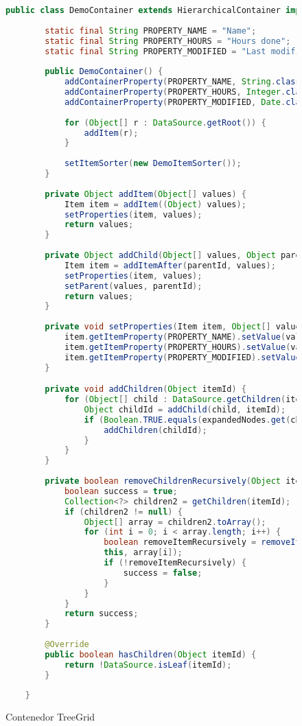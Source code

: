 \begin{figure}[!tb]
	\centering
	\begin{lstlisting}[language=Java]
	public class DemoContainer extends HierarchicalContainer implements Collapsible, Measurable {
	
		static final String PROPERTY_NAME = "Name";
		static final String PROPERTY_HOURS = "Hours done";
		static final String PROPERTY_MODIFIED = "Last modified";
		
		public DemoContainer() {
			addContainerProperty(PROPERTY_NAME, String.class, "");
			addContainerProperty(PROPERTY_HOURS, Integer.class, 0);
			addContainerProperty(PROPERTY_MODIFIED, Date.class, new Date());
			
			for (Object[] r : DataSource.getRoot()) {
				addItem(r);
			}
			
			setItemSorter(new DemoItemSorter());
		}
		
		private Object addItem(Object[] values) {
			Item item = addItem((Object) values);
			setProperties(item, values);
			return values;
		}
		
		private Object addChild(Object[] values, Object parentId) {
			Item item = addItemAfter(parentId, values);
			setProperties(item, values);
			setParent(values, parentId);
			return values;
		}
		
		private void setProperties(Item item, Object[] values) {
			item.getItemProperty(PROPERTY_NAME).setValue(values[0]);
			item.getItemProperty(PROPERTY_HOURS).setValue(values[1]);
			item.getItemProperty(PROPERTY_MODIFIED).setValue(values[2]);
		}

		private void addChildren(Object itemId) {
			for (Object[] child : DataSource.getChildren(itemId)) {
				Object childId = addChild(child, itemId);
				if (Boolean.TRUE.equals(expandedNodes.get(childId))) {
					addChildren(childId);
				}
			}
		}
		
		private boolean removeChildrenRecursively(Object itemId) {
			boolean success = true;
			Collection<?> children2 = getChildren(itemId);
			if (children2 != null) {
				Object[] array = children2.toArray();
				for (int i = 0; i < array.length; i++) {
					boolean removeItemRecursively = removeItemRecursively(
					this, array[i]);
					if (!removeItemRecursively) {
						success = false;
					}
				}
			}
			return success;	
		}
		
		@Override
		public boolean hasChildren(Object itemId) {
			return !DataSource.isLeaf(itemId);
		}
		
	}\end{lstlisting}
	\caption{Contenedor TreeGrid}
	\label{fig:demoContainer}
\end{figure}



